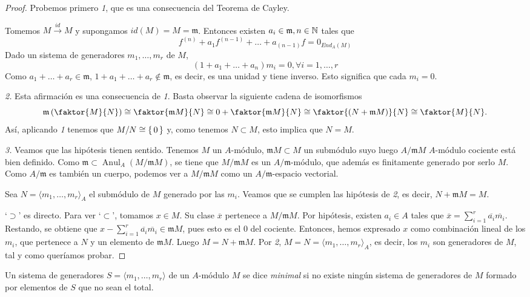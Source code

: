 \documentclass[../main.tex]{subfiles}
\begin{document}
\begin{proof}
	Probemos primero \textit{1}, que es una consecuencia del Teorema de Cayley.

	Tomemos $M\overset{id}{\longrightarrow}M$ y supongamos $id(M)=M=\mathfrak{m}$. Entonces existen $a_i\in\mathfrak{m},n\in\mathbb{N}$ tales que $$f^{(n)}+a_1f^{(n-1)}+\dots+a_{(n-1)}f=0_{End_A(M)}$$ Dado un sistema de generadores $m_1,\dots, m_r$ de $M$, $$(1+a_1+\dots+a_n)m_i=0, \forall i=1,\dots,r$$ Como $a_1+\dots+a_r\in\mathfrak{m}$, $1+a_1+\dots+a_r\notin\mathfrak{m}$, es decir, es una unidad y tiene inverso. Esto significa que cada $m_i=0$.

	\textit{2.} Esta afirmación es una consecuencia de \textit{1}. Basta observar la siguiente cadena de isomorfismos
	$$\mathfrak m\left(\faktor{M}{N}\right)\cong\faktor{\mathfrak m M}{N}\cong 0+\faktor{\mathfrak m M}{N}\cong \faktor{(N+\mathfrak m M)}{N}\cong \faktor{M}{N}.$$
	Así, aplicando \textit{1} tenemos que $M/N\cong \set{0}$ y, como tenemos $N\subset M$, esto implica que $N=M.$

	\textit{3.} Veamos que las hipótesis tienen sentido. Tenemos $M$ un $A$-módulo, $\mathfrak{m}M\subset M$ un submódulo suyo luego $A/\mathfrak{m}M$ $A$-módulo cociente está bien definido. Como $\mathfrak{m}\subset \operatorname{Anul}_A(M/\mathfrak{m}M)$, se tiene que $M/\mathfrak{m}M$ es un $A/\mathfrak{m}$-módulo, que además es finitamente generado por serlo $M$. Como $A/\mathfrak{m}$ es también un cuerpo, podemos ver a $M/\mathfrak{m}M$ como un $A/\mathfrak{m}$-espacio vectorial.

	Sea $N=\langle m_1,\dots,m_r\rangle_A$ el submódulo de $M$ generado por las $m_i$. Veamos que se cumplen las hipótesis de \textit{2}, es decir, $N+\mathfrak{m}M=M$.

	`$\supset$' es directo. Para ver `$\subset$', tomamos $x\in M$. Su clase $\overline{x}$ pertenece a $M/\mathfrak{m}M$. Por hipótesis, existen $a_i\in A$ tales que $\overline{x}=\sum_{i=1}^{r}\overline{a_i}\overline{m_i}$. Restando, se obtiene que $x-\sum_{i=1}^{r}\overline{a_i}\overline{m_i}\in\mathfrak{m}M$, pues esto es el $0$ del cociente. Entonces, hemos expresado $x$ como combinación lineal de los $m_i$, que pertenece a $N$ y un elemento de $\mathfrak{m}M$. Luego $M=N+\mathfrak{m}M$. Por \textit{2}, $M=N=\langle m_1,\dots,m_r\rangle_A$, es decir, los $m_i$ son generadores de $M$, tal y como queríamos probar.
\end{proof}
\begin{definition}
	Un sistema de generadores $S=\langle m_1,\dots,m_r\rangle$ de un $A$-módulo $M$ se dice \textit{minimal} si no existe ningún sistema de generadores de $M$ formado por elementos de $S$ que no sean el total.
\end{definition}
\end{document}
